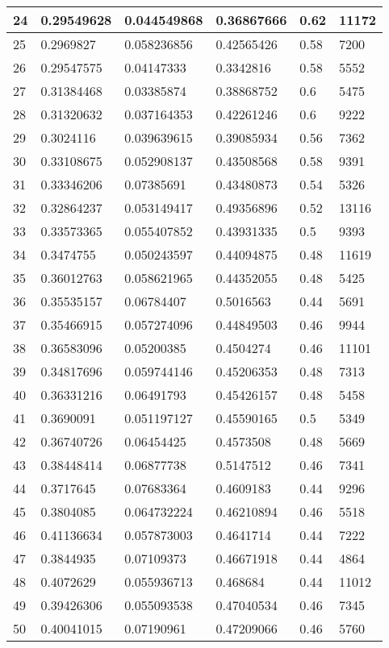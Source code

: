 \begin{longtable}{|l|l|l|l|l|l|}
24 & 0.29549628 & 0.044549868 & 0.36867666 & 0.62 & 11172 \\ \hline 
25 & 0.2969827 & 0.058236856 & 0.42565426 & 0.58 & 7200 \\ \hline 
26 & 0.29547575 & 0.04147333 & 0.3342816 & 0.58 & 5552 \\ \hline 
27 & 0.31384468 & 0.03385874 & 0.38868752 & 0.6 & 5475 \\ \hline 
28 & 0.31320632 & 0.037164353 & 0.42261246 & 0.6 & 9222 \\ \hline 
29 & 0.3024116 & 0.039639615 & 0.39085934 & 0.56 & 7362 \\ \hline 
30 & 0.33108675 & 0.052908137 & 0.43508568 & 0.58 & 9391 \\ \hline 
31 & 0.33346206 & 0.07385691 & 0.43480873 & 0.54 & 5326 \\ \hline 
32 & 0.32864237 & 0.053149417 & 0.49356896 & 0.52 & 13116 \\ \hline 
33 & 0.33573365 & 0.055407852 & 0.43931335 & 0.5 & 9393 \\ \hline 
34 & 0.3474755 & 0.050243597 & 0.44094875 & 0.48 & 11619 \\ \hline 
35 & 0.36012763 & 0.058621965 & 0.44352055 & 0.48 & 5425 \\ \hline 
36 & 0.35535157 & 0.06784407 & 0.5016563 & 0.44 & 5691 \\ \hline 
37 & 0.35466915 & 0.057274096 & 0.44849503 & 0.46 & 9944 \\ \hline 
38 & 0.36583096 & 0.05200385 & 0.4504274 & 0.46 & 11101 \\ \hline 
39 & 0.34817696 & 0.059744146 & 0.45206353 & 0.48 & 7313 \\ \hline 
40 & 0.36331216 & 0.06491793 & 0.45426157 & 0.48 & 5458 \\ \hline 
41 & 0.3690091 & 0.051197127 & 0.45590165 & 0.5 & 5349 \\ \hline 
42 & 0.36740726 & 0.06454425 & 0.4573508 & 0.48 & 5669 \\ \hline 
43 & 0.38448414 & 0.06877738 & 0.5147512 & 0.46 & 7341 \\ \hline 
44 & 0.3717645 & 0.07683364 & 0.4609183 & 0.44 & 9296 \\ \hline 
45 & 0.3804085 & 0.064732224 & 0.46210894 & 0.46 & 5518 \\ \hline 
46 & 0.41136634 & 0.057873003 & 0.4641714 & 0.44 & 7222 \\ \hline 
47 & 0.3844935 & 0.07109373 & 0.46671918 & 0.44 & 4864 \\ \hline 
48 & 0.4072629 & 0.055936713 & 0.468684 & 0.44 & 11012 \\ \hline 
49 & 0.39426306 & 0.055093538 & 0.47040534 & 0.46 & 7345 \\ \hline 
50 & 0.40041015 & 0.07190961 & 0.47209066 & 0.46 & 5760 \\ \hline 
\end{longtable}